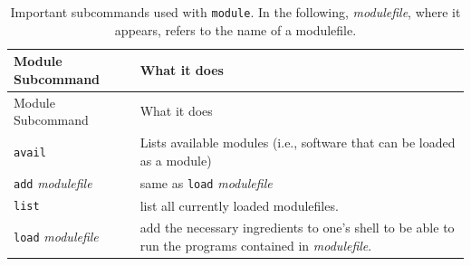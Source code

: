 \documentclass[]{krantz}
\begin{document}
\begin{longtable}[]{@{}ll@{}}
\caption{\label{tab:module} Important subcommands used with \texttt{module}. In the following, \emph{modulefile}, where it appears, refers to the name of a modulefile.}\tabularnewline
\toprule
\begin{minipage}[b]{0.31\columnwidth}\raggedright
Module Subcommand\strut
\end{minipage} & \begin{minipage}[b]{0.43\columnwidth}\raggedright
What it does\strut
\end{minipage}\tabularnewline
\midrule
\endfirsthead
\toprule
\begin{minipage}[b]{0.31\columnwidth}\raggedright
Module Subcommand\strut
\end{minipage} & \begin{minipage}[b]{0.43\columnwidth}\raggedright
What it does\strut
\end{minipage}\tabularnewline
\midrule
\endhead
\begin{minipage}[t]{0.31\columnwidth}\raggedright
\texttt{avail}\strut
\end{minipage} & \begin{minipage}[t]{0.43\columnwidth}\raggedright
Lists available modules (i.e.,
software that can be loaded as
a module)\strut
\end{minipage}\tabularnewline
\begin{minipage}[t]{0.31\columnwidth}\raggedright
\texttt{add} \emph{modulefile}\strut
\end{minipage} & \begin{minipage}[t]{0.43\columnwidth}\raggedright
same as \texttt{load} \emph{modulefile}\strut
\end{minipage}\tabularnewline
\begin{minipage}[t]{0.31\columnwidth}\raggedright
\texttt{list}\strut
\end{minipage} & \begin{minipage}[t]{0.43\columnwidth}\raggedright
list all currently loaded
modulefiles.\strut
\end{minipage}\tabularnewline
\begin{minipage}[t]{0.31\columnwidth}\raggedright
\texttt{load} \emph{modulefile}\strut
\end{minipage} & \begin{minipage}[t]{0.43\columnwidth}\raggedright
add the necessary ingredients
to one's shell to be able to
run the programs contained in
\emph{modulefile}.\strut
\end{minipage}\tabularnewline

\end{longtable}
\end{document}
